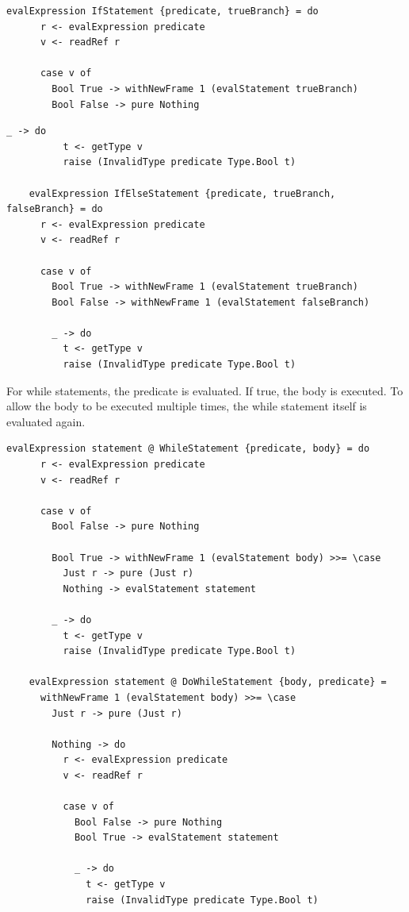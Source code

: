 \documentclass[UdineBachThesis,american,11pt]{PhdThesis}
\begin{document}
  \begin{lstlisting}[gobble=4,basicstyle=\ttfamily\small]
    evalExpression IfStatement {predicate, trueBranch} = do
      r <- evalExpression predicate
      v <- readRef r

      case v of
        Bool True -> withNewFrame 1 (evalStatement trueBranch)
        Bool False -> pure Nothing
  \end{lstlisting}

  \newpage

  \begin{lstlisting}[gobble=4,basicstyle=\ttfamily\small]
        _ -> do
          t <- getType v
          raise (InvalidType predicate Type.Bool t)

    evalExpression IfElseStatement {predicate, trueBranch, falseBranch} = do
      r <- evalExpression predicate
      v <- readRef r

      case v of
        Bool True -> withNewFrame 1 (evalStatement trueBranch)
        Bool False -> withNewFrame 1 (evalStatement falseBranch)

        _ -> do
          t <- getType v
          raise (InvalidType predicate Type.Bool t)
  \end{lstlisting}

  For while statements, the predicate is evaluated. If true, the body is
  executed. To allow the body to be executed multiple times, the while statement
  itself is evaluated again.

  \begin{lstlisting}[gobble=4,basicstyle=\ttfamily\small]
    evalExpression statement @ WhileStatement {predicate, body} = do
      r <- evalExpression predicate
      v <- readRef r

      case v of
        Bool False -> pure Nothing

        Bool True -> withNewFrame 1 (evalStatement body) >>= \case
          Just r -> pure (Just r)
          Nothing -> evalStatement statement

        _ -> do
          t <- getType v
          raise (InvalidType predicate Type.Bool t)

    evalExpression statement @ DoWhileStatement {body, predicate} =
      withNewFrame 1 (evalStatement body) >>= \case
        Just r -> pure (Just r)

        Nothing -> do
          r <- evalExpression predicate
          v <- readRef r

          case v of
            Bool False -> pure Nothing
            Bool True -> evalStatement statement

            _ -> do
              t <- getType v
              raise (InvalidType predicate Type.Bool t)
  \end{lstlisting}
\end{document}
